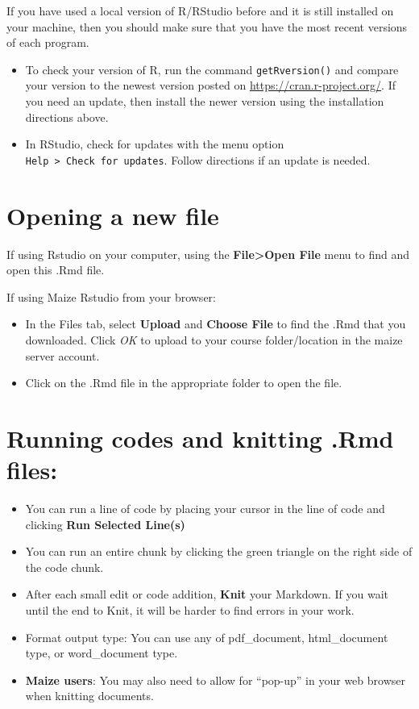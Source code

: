 \documentclass[
]{book}
\begin{document}
If you have used a local version of R/RStudio before and it is still installed on your machine, then you should make sure that you have the most recent versions of each program.

\begin{itemize}
\item
  To check your version of R, run the command \texttt{getRversion()} and compare your version to the newest version posted on \url{https://cran.r-project.org/}. If you need an update, then install the newer version using the installation directions above.
\item
  In RStudio, check for updates with the menu option \texttt{Help\ \textgreater{}\ Check\ for\ updates}. Follow directions if an update is needed.
\end{itemize}

\hypertarget{opening-a-new-file}{%
\section{Opening a new file}\label{opening-a-new-file}}

If using Rstudio on your computer, using the \textbf{File\textgreater Open File} menu to find and open this .Rmd file.

If using Maize Rstudio from your browser:

\begin{itemize}
\item
  In the Files tab, select \textbf{Upload} and \textbf{Choose File} to find the .Rmd that you downloaded. Click \emph{OK} to upload to your course folder/location in the maize server account.
\item
  Click on the .Rmd file in the appropriate folder to open the file.
\end{itemize}

\hypertarget{running-codes-and-knitting-.rmd-files}{%
\section{Running codes and knitting .Rmd files:}\label{running-codes-and-knitting-.rmd-files}}

\begin{itemize}
\item
  You can run a line of code by placing your cursor in the line of code and clicking \textbf{Run Selected Line(s)}
\item
  You can run an entire chunk by clicking the green triangle on the right side of the code chunk.
\item
  After each small edit or code addition, \textbf{Knit} your Markdown. If you wait until the end to Knit, it will be harder to find errors in your work.
\item
  Format output type: You can use any of pdf\_document, html\_document type, or word\_document type.
\item
  \textbf{Maize users}: You may also need to allow for ``pop-up'' in your web browser when knitting documents.
\end{itemize}
\end{document}

